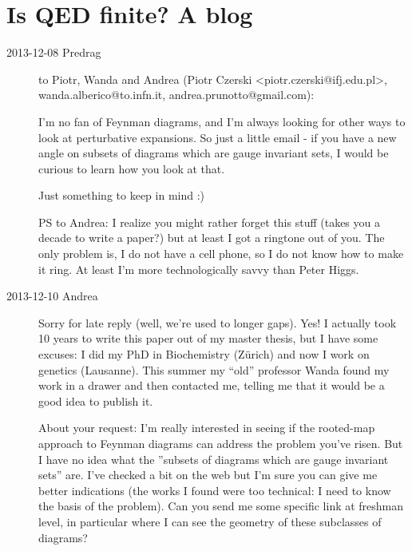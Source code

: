 
\section{Is QED finite? A blog}
\label{sect:finiteBlog}

\begin{description}

\item[2013-12-08  Predrag] to Piotr, Wanda and Andrea
(Piotr Czerski <piotr.czerski@ifj.edu.pl>,
 wanda.alberico@to.infn.it,
 andrea.prunotto@gmail.com):

I'm no fan of Feynman diagrams, and I'm always looking
for other ways to look at perturbative expansions. So just a little email
- if you have a new angle on subsets of diagrams which are gauge
invariant sets, I would be curious to learn how you look at that.

Just something to keep in mind :)

PS to Andrea: I realize you might rather forget this stuff (takes you a
decade to write a paper?) but at least I got a ringtone out of you. The
only problem is, I do not have a cell phone, so I do not know how to make
it ring. At least I'm more technologically savvy than
{Peter Higgs}.

\item[2013-12-10   {Andrea}]
Sorry for late reply (well, we're used to longer gaps). Yes! I actually
took 10 years to write this paper out of my master thesis, but I have
some excuses: I did my PhD in Biochemistry (Z\"urich) and now I work on
genetics (Lausanne). This summer my ``old'' professor Wanda found my work
in a drawer and then contacted me, telling me that it would be a good
idea to publish it.

About your request: I'm really interested in seeing if the rooted-map
approach to Feynman diagrams can address the problem you've risen. But I
have no idea what the ''subsets of diagrams which are gauge invariant
sets'' are. I've checked a bit on the web but I'm sure you can give me
better indications (the works I found were too technical: I need to know
the basis of the problem). Can you send me some specific link at freshman
level, in particular where I can see the geometry of these subclasses of
diagrams?


\end{description}
